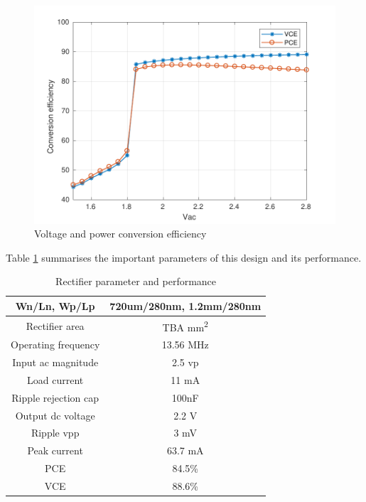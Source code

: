 \documentclass[12pt,a4paper,UKenglish]{article}
\begin{document}
\begin{figure}[htbp] %
   \centering
   \includegraphics[width=\textwidth]{img/rectifier_ce.pdf} 
   \caption{Voltage and power conversion efficiency}
   \label{rect_ce}
\end{figure}

Table \ref{rect_spec} summarises the important parameters of this design and its performance.

\begin{table}[H]
\caption{Rectifier parameter and performance}
\begin{center}
\begin{tabular}{c|c}
\hline \hline
Wn/Ln, Wp/Lp 		& 720um/280nm, 1.2mm/280nm \\ \hline
Rectifier area 		& TBA mm\textsuperscript{2} \\ \hline
Operating frequency 	& 13.56 MHz \\ \hline
Input ac magnitude	& 2.5  \acrshort{vp} \\ \hline
Load current 		& 11 mA \\ \hline
Ripple rejection cap 	& 100nF \\ \hline
Output dc voltage 	& 2.2 V \\ \hline
Ripple \acrshort{vpp} 	& 3 mV \\ \hline
Peak current 		& 63.7 mA \\ \hline
PCE 			& 84.5\% \\ \hline
VCE 			& 88.6\% \\
\hline \hline
\end{tabular}
\end{center}
\label{rect_spec}
\end{table}
\end{document}
